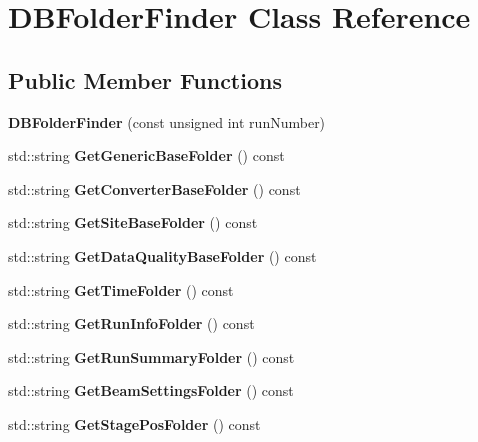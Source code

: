\section{D\-B\-Folder\-Finder Class Reference}
\label{classDBFolderFinder}
\subsection*{Public Member Functions}
\begin{DoxyCompactItemize}
\item 
{\bfseries D\-B\-Folder\-Finder} (const unsigned int run\-Number)\label{classDBFolderFinder_af3666d659447ba5fbceabe659ba711d1}

\item 
std\-::string {\bfseries Get\-Generic\-Base\-Folder} () const \label{classDBFolderFinder_a5301cc50babf63152d467723530a9f59}

\item 
std\-::string {\bfseries Get\-Converter\-Base\-Folder} () const \label{classDBFolderFinder_af2e0f1d004305fcd3cb8dd2f13afed10}

\item 
std\-::string {\bfseries Get\-Site\-Base\-Folder} () const \label{classDBFolderFinder_a4498f1e7dd7f662e2cc5eaad31203f7b}

\item 
std\-::string {\bfseries Get\-Data\-Quality\-Base\-Folder} () const \label{classDBFolderFinder_a9087801a8fd1b9e23bf681b635a353be}

\item 
std\-::string {\bfseries Get\-Time\-Folder} () const \label{classDBFolderFinder_a98dfeb36fa95d548fa5192885755e5f5}

\item 
std\-::string {\bfseries Get\-Run\-Info\-Folder} () const \label{classDBFolderFinder_a41e40b97d0feae4295f56e1ac9a37112}

\item 
std\-::string {\bfseries Get\-Run\-Summary\-Folder} () const \label{classDBFolderFinder_a19640d749f752b6638fc30d0cf78c998}

\item 
std\-::string {\bfseries Get\-Beam\-Settings\-Folder} () const \label{classDBFolderFinder_ad6ffd0fd21041f78cd25090261dbe6b0}

\item 
std\-::string {\bfseries Get\-Stage\-Pos\-Folder} () const \label{classDBFolderFinder_a4f782fa1e5c90364dbc4b4b62ecd7a77}


\end{DoxyCompactItemize}
